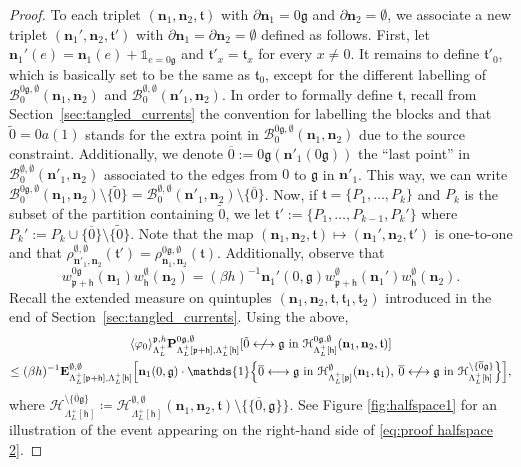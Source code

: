 \documentclass[11pt,a4paper]{article}
\theoremstyle{definition}
\numberwithin{equation}{section}
\newcommand\n{\mathbf{n}}
\newcommand\fg{\mathfrak{g}}
\newcommand\ft{\mathfrak{t}}
\begin{document}
\begin{proof}
To each triplet $(\n_1,\n_2,\ft)$ with $\partial\n_1=0\fg$ and $\partial\n_2=\emptyset$, we associate a new triplet $(\n_1',\n_2,\ft')$ with $\partial\n_1=\partial\n_2=\emptyset$ defined as follows. First, let $\n_1'(e)=\n_1(e)+\mathds{1}_{e=0\fg}$ and $\ft'_x=\ft_x$ for every $x\neq0$. It remains to define $\ft'_0$, which is basically set to be the same as $\ft_0$, except for the different labelling of $\mathcal{B}^{0\fg,\emptyset}_0(\n_1,\n_2)$ and $\mathcal{B}^{\emptyset,\emptyset}_0(\n'_1,\n_2)$. In order to formally define $\ft$, recall from Section~\ref{sec:tangled_currents} the convention for labelling the blocks and that $\tilde{0}=0a(1)$ stands for the extra point in $\mathcal{B}^{0\fg,\emptyset}_0(\n_1,\n_2)$ due to the source constraint. Additionally, we denote $\overline{0}:=0\fg(\n'_1(0\fg))$ the ``last point'' in $\mathcal{B}^{\emptyset,\emptyset}_0(\n'_1,\n_2)$ associated to the edges from $0$ to $\fg$ in $\n'_1$. This way, we can write $\mathcal{B}^{0\fg,\emptyset}_0(\n_1,\n_2)\setminus\{\tilde{0}\}=\mathcal{B}^{\emptyset,\emptyset}_0(\n'_1,\n_2)\setminus\{\overline{0}\}$. Now, if $\ft=\{P_1,\ldots, P_k\}$ and $P_k$ is the subset of the partition containing $\tilde 0$, we let $\ft':=\{P_1,\ldots,P_{k-1},P_k'\}$ where $P_k':=P_k\cup\{\overline{0}\}\setminus \{\tilde 0\}$. 
Note that the map $(\n_1,\n_2,\ft)\mapsto (\n_1',\n_2,\ft')$ is one-to-one and that $\rho_{\n'_1,\n_2}^{\emptyset,\emptyset}(\ft')=\rho_{\n_1,\n_2}^{0\fg,\emptyset}(\ft)$. Additionally, observe that 
\begin{equation}
    w^{0\fg}_{\mathfrak{p}+\mathsf{h}}(\n_1)w^\emptyset_{\mathsf{h}}(\n_2)=(\beta h)^{-1}\n_1'(0,\fg)w^\emptyset_{\mathfrak{p}+\mathsf{h}}(\n_1')w^\emptyset_{\mathsf{h}}(\n_2).
\end{equation}
Recall the extended measure on quintuples $(\n_1,\n_2,\ft,\ft_1,\ft_2)$ introduced in the end of Section~\ref{sec:tangled_currents}. 
Using the above, 
\begin{multline}\label{eq:proof halfspace 2}
    \langle \varphi_0\rangle_{\Lambda_L^+}^{\mathfrak{p},h}\mathbf P_{\Lambda_L^+[\mathfrak{p}+\mathsf{h}],\Lambda_L^+[\mathsf{h}]}^{0\fg,\emptyset}[\tilde 0 \centernot\longleftrightarrow \fg \text{ in } \mathcal{H}^{0\fg,\emptyset}_{\Lambda_L^+[\mathsf{h}]}(\n_1,\n_2,\ft)]
    \\\leq 
    (\beta h)^{-1}\mathbf E_{\Lambda_L^+[\mathfrak{p}+\mathsf{h}],\Lambda_L^+[\mathsf{h}]}^{\emptyset,\emptyset}\Big[\n_1(0,\fg)\cdot\mathds{1}\Big\{ \overline{0}\longleftrightarrow \fg \text{ in }\mathcal{H}^\emptyset_{\Lambda_L^+[\mathfrak{p}]}(\n_1,\ft_1) ,\: \overline{0}\centernot\longleftrightarrow \fg \text{ in } \mathcal{H}_{\Lambda^+_L[\mathsf{h}]}^{\setminus \{\overline{0}\fg\}}\Big\}\Big],
\end{multline}
where $\mathcal{H}^{\setminus \{\overline{0}\fg\}}_{\Lambda^+_L[\mathsf{h}]}\coloneqq \mathcal{H}_{\Lambda^+_L[\mathsf{h}]}^{\emptyset,\emptyset}(\n_1,\n_2,\ft)\setminus \{\{\overline{0},\fg\}\}$. See Figure \ref{fig:halfspace1} for an illustration of the event appearing on the right-hand side of \eqref{eq:proof halfspace 2}. 


\end{proof}
\end{document}
